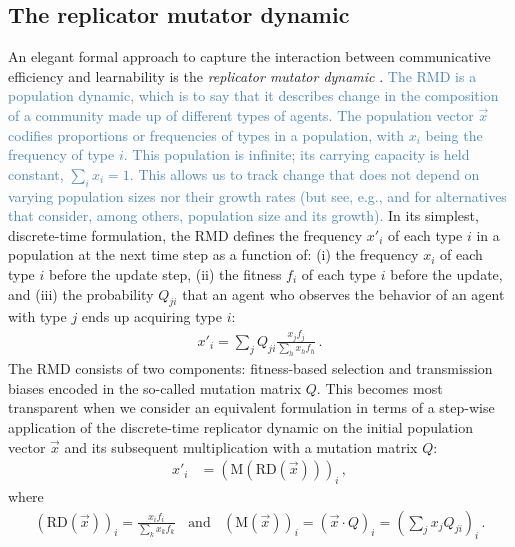 \documentclass[a4paper, 11pt]{article}
\theoremstyle{Satz}
\newcommand{\rvv}[1]{\textcolor{Steelblue}{#1}}%
\begin{document}
\subsection{The replicator mutator dynamic}
An elegant formal approach to capture the interaction between communicative efficiency and learnability is
the \emph{replicator mutator dynamic}
\citep{Hofbauer1985:The-Selection-M,nowak+etal:2000,NowakKomarova2001:Evolution-of-Un,hofbauer+sigmund:2003,nowak:2006}. \rvv{The RMD is a population dynamic, which is to say that it describes change in the composition of a community made up of different types of agents. The population vector $\vec{x}$ codifies proportions or frequencies of types in a population, with $x_i$ being the frequency of type $i$. This population is infinite; its carrying capacity is held constant, $\sum\nolimits_i x_i = 1$. This allows us to track change that does not depend on varying population sizes nor their growth rates (but see, e.g., \citealt{nowak:2006} and \citealt[\S 5]{Skyrms2010:Signals} for alternatives that consider, among others, population size and its growth).} In its simplest, discrete-time formulation, the RMD defines the frequency $x'_i$ of each type $i$ in a population at the next time step as a function of: (i) the frequency $x_i$ of each type
$i$ before the update step, (ii) the fitness $f_i$ of each type $i$ before the update, and
(iii) the probability $Q_{ji}$ that an agent who observes the behavior of 
an agent with type $j$ ends up acquiring type $i$:
\begin{align}
  \label{eq:RMD_discrete}
  x'_i = \sum_j Q_{ji} \frac{x_jf_j}{\sum_h x_h f_h}\,.
\end{align}
The RMD consists of two components: fitness-based selection and transmission biases encoded in the so-called mutation matrix $Q$. This
becomes most transparent when we consider an equivalent formulation in terms of a step-wise
application of the discrete-time replicator dynamic \citep{TaylorJonker1978:Evolutionary-St} on the initial population vector $\vec{x}$
and its subsequent multiplication with a mutation matrix $Q$:
\begin{align}
  \label{eq:RMD_discrete_recast}
  x'_i & = (\text{M}(\text{RD}(\vec{x})))_i\,,
\end{align}
where
\begin{align*}
      \left ( \text{RD}(\vec{x}) \right )_i 
         = \frac{x_i f_i}{\sum_k x_k f_k}
 \ \ \ \ \text{and} \ \ \ \ 
  (\text{M}(\vec{x}))_i = (\vec{x} \cdot Q)_i = \left ( \sum_j
          x_j Q_{ji} \right)_i\,.
\end{align*}
%
\end{document}
